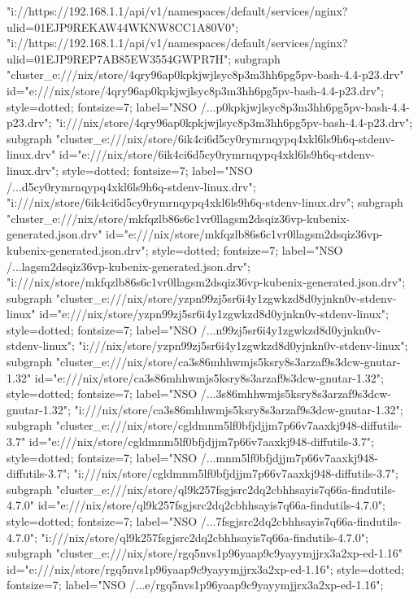 {{"i://https://192.168.1.1/api/v1/namespaces/default/services/nginx?ulid=01EJP9REKAW44WKNW8CC1A80V0";
"i://https://192.168.1.1/api/v1/namespaces/default/services/nginx?ulid=01EJP9REP7AB85EW3554GWPR7H";
}
subgraph "cluster_e:///nix/store/4qry96ap0kpkjwjlsyc8p3m3hh6pg5pv-bash-4.4-p23.drv" {
id="e:///nix/store/4qry96ap0kpkjwjlsyc8p3m3hh6pg5pv-bash-4.4-p23.drv";
style=dotted;
fontsize=7;
label="NSO /...p0kpkjwjlsyc8p3m3hh6pg5pv-bash-4.4-p23.drv";
"i:///nix/store/4qry96ap0kpkjwjlsyc8p3m3hh6pg5pv-bash-4.4-p23.drv";
}
subgraph "cluster_e:///nix/store/6ik4ci6d5cy0rymrnqypq4xkl6ls9h6q-stdenv-linux.drv" {
id="e:///nix/store/6ik4ci6d5cy0rymrnqypq4xkl6ls9h6q-stdenv-linux.drv";
style=dotted;
fontsize=7;
label="NSO /...d5cy0rymrnqypq4xkl6ls9h6q-stdenv-linux.drv";
"i:///nix/store/6ik4ci6d5cy0rymrnqypq4xkl6ls9h6q-stdenv-linux.drv";
}
subgraph "cluster_e:///nix/store/mkfqzlb86s6c1vr0llagsm2dsqiz36vp-kubenix-generated.json.drv" {
id="e:///nix/store/mkfqzlb86s6c1vr0llagsm2dsqiz36vp-kubenix-generated.json.drv";
style=dotted;
fontsize=7;
label="NSO /...lagsm2dsqiz36vp-kubenix-generated.json.drv";
"i:///nix/store/mkfqzlb86s6c1vr0llagsm2dsqiz36vp-kubenix-generated.json.drv";
}
subgraph "cluster_e:///nix/store/yzpn99zj5sr6i4y1zgwkzd8d0yjnkn0v-stdenv-linux" {
id="e:///nix/store/yzpn99zj5sr6i4y1zgwkzd8d0yjnkn0v-stdenv-linux";
style=dotted;
fontsize=7;
label="NSO /...n99zj5sr6i4y1zgwkzd8d0yjnkn0v-stdenv-linux";
"i:///nix/store/yzpn99zj5sr6i4y1zgwkzd8d0yjnkn0v-stdenv-linux";
}
subgraph "cluster_e:///nix/store/ca3s86mhhwmjs5ksry8s3arzaf9s3dcw-gnutar-1.32" {
id="e:///nix/store/ca3s86mhhwmjs5ksry8s3arzaf9s3dcw-gnutar-1.32";
style=dotted;
fontsize=7;
label="NSO /...3s86mhhwmjs5ksry8s3arzaf9s3dcw-gnutar-1.32";
"i:///nix/store/ca3s86mhhwmjs5ksry8s3arzaf9s3dcw-gnutar-1.32";
}
subgraph "cluster_e:///nix/store/cgldmnm5lf0bfjdjjm7p66v7aaxkj948-diffutils-3.7" {
id="e:///nix/store/cgldmnm5lf0bfjdjjm7p66v7aaxkj948-diffutils-3.7";
style=dotted;
fontsize=7;
label="NSO /...mnm5lf0bfjdjjm7p66v7aaxkj948-diffutils-3.7";
"i:///nix/store/cgldmnm5lf0bfjdjjm7p66v7aaxkj948-diffutils-3.7";
}
subgraph "cluster_e:///nix/store/ql9k257fsgjsrc2dq2cbhhsayis7q66a-findutils-4.7.0" {
id="e:///nix/store/ql9k257fsgjsrc2dq2cbhhsayis7q66a-findutils-4.7.0";
style=dotted;
fontsize=7;
label="NSO /...7fsgjsrc2dq2cbhhsayis7q66a-findutils-4.7.0";
"i:///nix/store/ql9k257fsgjsrc2dq2cbhhsayis7q66a-findutils-4.7.0";
}
subgraph "cluster_e:///nix/store/rgq5nvs1p96yaap9c9yayymjjrx3a2xp-ed-1.16" {
id="e:///nix/store/rgq5nvs1p96yaap9c9yayymjjrx3a2xp-ed-1.16";
style=dotted;
fontsize=7;
label="NSO /...e/rgq5nvs1p96yaap9c9yayymjjrx3a2xp-ed-1.16";
}}
